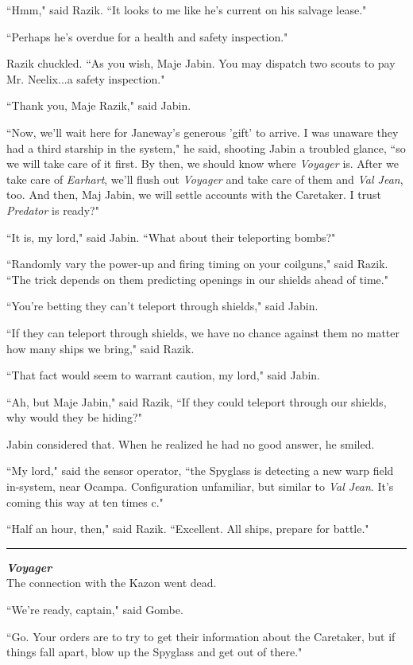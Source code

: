 \documentclass[twoside,letterpaper,12pt]{memoir}
\begin{document}
``Hmm," said Razik. ``It looks to me like he's current on his salvage lease."

``Perhaps he's overdue for a health and safety inspection."

Razik chuckled. ``As you wish, Maje Jabin. You may dispatch two scouts to pay Mr. Neelix...a safety inspection."

``Thank you, Maje Razik," said Jabin.

``Now, we'll wait here for Janeway's generous 'gift' to arrive. I was unaware they had a third starship in the system," he said, shooting Jabin a troubled glance, ``so we will take care of it first. By then, we should know where \textit{Voyager} is. After we take care of \textit{Earhart}, we'll flush out \textit{Voyager} and take care of them and \textit{Val Jean}, too. And then, Maj Jabin, we will settle accounts with the Caretaker. I trust \textit{Predator} is ready?"

``It is, my lord," said Jabin. ``What about their teleporting bombs?"

``Randomly vary the power-up and firing timing on your coilguns," said Razik. ``The trick depends on them predicting openings in our shields ahead of time."

``You're betting they can't teleport through shields," said Jabin.

``If they can teleport through shields, we have no chance against them no matter how many ships we bring," said Razik.

``That fact would seem to warrant caution, my lord," said Jabin.

``Ah, but Maje Jabin," said Razik, ``If they could teleport through our shields, why would they be hiding?"

Jabin considered that. When he realized he had no good answer, he smiled.

``My lord," said the sensor operator, ``the Spyglass is detecting a new warp field in-system, near Ocampa. Configuration unfamiliar, but similar to \textit{Val Jean}. It's coming this way at ten times c."

``Half an hour, then," said Razik. ``Excellent. All ships, prepare for battle."

\fancybreak{\rule{3cm}{0.4 pt}}
\noindent\textit{\textbf{Voyager}}\\

The connection with the Kazon went dead.

``We're ready, captain," said Gombe.

``Go. Your orders are to try to get their information about the Caretaker, but if things fall apart, blow up the Spyglass and get out of there."
\end{document}
